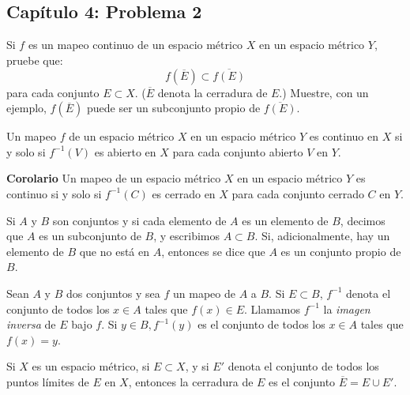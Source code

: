 \subsection{Capítulo 4: Problema 2}
Si $f$ es un mapeo continuo de un espacio métrico $X$ en un espacio métrico $Y$, pruebe que: 
$$f(\overline{E})\subset\overline{f(E)}$$
para cada conjunto $E\subset X$. ($\overline{E}$ denota la cerradura de $E$.) Muestre, con un ejemplo, $f(\overline{E})$ puede ser un subconjunto propio de $\overline{f(E)}$.

\begin{tcolorbox}[colback=gray!15,colframe=gray!1!gray,title=  Teorema 4.8 de \cite{rudin1976principles} ]
Un mapeo $f$ de un espacio métrico $X$ en un espacio métrico $Y$ es continuo en $X$ si y solo si $f^{-1}(V)$ es abierto en $X$ para cada conjunto abierto $V$ en $Y$.
\newline 

\textbf{Corolario}
\newline 
Un mapeo de un espacio métrico $X$ en un espacio métrico $Y$ es continuo si y solo si $f^{-1}(C)$ es cerrado en $X$ para cada conjunto cerrado $C$ en $Y$.
\end{tcolorbox}
\begin{tcolorbox}[colback=blue!15,colframe=blue!1!blue,title= Definición 1.3 de \cite{rudin1976principles} ]
Si $A$ y $B$ son conjuntos y si cada elemento de $A$ es un elemento de $B$, decimos que $A$ es un subconjunto de $B$, y escribimos $A\subset B$. Si, adicionalmente, hay un elemento de $B$ que no está en $A$, entonces se dice que $A$ es un conjunto propio de $B$.
\end{tcolorbox}
\begin{tcolorbox}[colback=blue!15,colframe=blue!1!blue,title= Definición 2.2 de \cite{rudin1976principles} ]
Sean $A$ y $B$ dos conjuntos y sea $f$ un mapeo de $A$ a $B$. Si $E\subset B$, $f^{-1}$ denota el conjunto de todos los $x\in A$ tales que $f(x)\in E$. Llamamos $f^{-1}$ la \textit{imagen inversa} de $E$ bajo $f$. Si $y\in B, f^{-1}(y)$ es el conjunto de todos los $x\in A$ tales que $f(x)=y$. 
\end{tcolorbox}
\begin{tcolorbox}[colback=blue!15,colframe=blue!1!blue,title= Definición (Cerradura) de \cite{rudin1976principles}]
Si $X$ es un espacio métrico, si $E\subset X$, y si $E'$ denota el conjunto de todos los puntos límites de $E$ en $X$, entonces la cerradura de $E$ es el conjunto $\overline{E}=E\cup E'$.
\end{tcolorbox}
